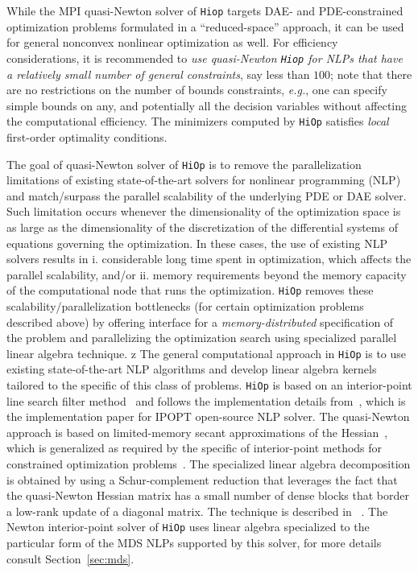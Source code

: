 \documentclass[11pt]{article}
\newcounter{line}
\newcommand{\Hi}{\texttt{HiOp}\xspace}
\begin{document}
While the MPI quasi-Newton solver of \texttt{Hiop} targets DAE- and PDE-constrained optimization problems formulated in a ``reduced-space'' approach, it can be used for general nonconvex nonlinear optimization as well. For efficiency considerations, it is recommended to \textit{use quasi-Newton \texttt{Hiop} for NLPs that have a relatively small number of general constraints}, say less than $100$; note that there are no restrictions on the number of bounds constraints, \textit{e.g.}, one can specify simple bounds on any, and potentially all the decision variables without affecting the computational efficiency. The minimizers computed by \Hi satisfies \textit{local} first-order optimality conditions.

The goal of quasi-Newton solver of \Hi is to remove the parallelization limitations of existing state-of-the-art solvers for nonlinear programming (NLP) and match/surpass the parallel scalability of the underlying PDE or DAE solver. Such limitation occurs whenever the dimensionality of the optimization space  is as large as the dimensionality of the discretization of the differential systems of equations governing the optimization. In these cases, the use of existing NLP solvers  results in i. considerable long time spent in optimization, which affects the parallel scalability, and/or ii. memory requirements beyond the memory capacity of the computational node that runs the optimization. \Hi removes these scalability/parallelization bottlenecks (for certain optimization problems described above) by offering interface for a \textit{memory-distributed} specification of the problem and parallelizing the optimization search using specialized parallel linear algebra technique.
z
The general computational approach in \Hi is to use existing state-of-the-art NLP algorithms and develop linear algebra kernels tailored to the specific of this
class of problems. \Hi is based on an interior-point line search filter method~\cite{waecther_05_ipopt2,waecther_05_ipopt} and follows the implementation details from~\cite{waecther_05_ipopt0}, which is the implementation paper for IPOPT open-source NLP solver. The quasi-Newton approach is based on limited-memory secant approximations of the Hessian~\cite{ByrdNocedalSchnabel_94_quasiNewtonRepres}, which is generalized as required by the specific of interior-point methods for constrained optimization problems~\cite{petra_hiop}. The specialized linear algebra decomposition is obtained by using a Schur-complement reduction that
leverages the fact that the quasi-Newton Hessian matrix has a small number of
dense blocks that border a low-rank update of a diagonal matrix. The technique is described  in ~\cite{petra_hiop}. The Newton interior-point solver of \Hi uses linear algebra specialized to the particular form of the MDS NLPs supported by this solver, for more details consult Section~\ref{sec:mds}. 
\end{document}
